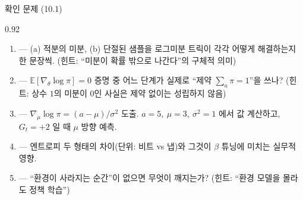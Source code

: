\begin{frame}{확인 문제 (10.1)}
\begin{center}\begin{varwidth}{0.92\textwidth}
  \small
  \begin{enumerate}
    \item {} --- (a) 적분의 미분, (b) 단절된 샘플을
      로그미분 트릭이 각각 어떻게 해결하는지 한 문장씩.
      (힌트: ``미분이 확률 밖으로 나간다''의 구체적 의미)
    \item {} --- $\mathbb{E}[\nabla_\theta\log\pi]=0$ 증명
      중 어느 단계가 실제로 ``제약 $\sum_a\pi=1$''을 쓰나?
      (힌트: 상수 $1$의 미분이 0인 사실은 제약 없이는 성립하지 않음)
    \item {} --- $\nabla_\mu\log\pi = (a-\mu)/\sigma^2$
      도출. $a=5,\ \mu=3,\ \sigma^2=1$ 에서 값 계산하고,
      $G_t=+2$ 일 때 $\mu$ 방향 예측.
    \item {} --- 엔트로피 두 형태의 차이(단위: 비트 vs
      냅)와 그것이 $\beta$ 튜닝에 미치는 실무적 영향.
    \item {} --- ``환경이 사라지는 순간''이 없으면
      무엇이 깨지는가? (힌트: ``환경 모델을 몰라도 정책 학습'')
  \end{enumerate}
  \normalsize
\end{varwidth}\end{center}
\end{frame}
